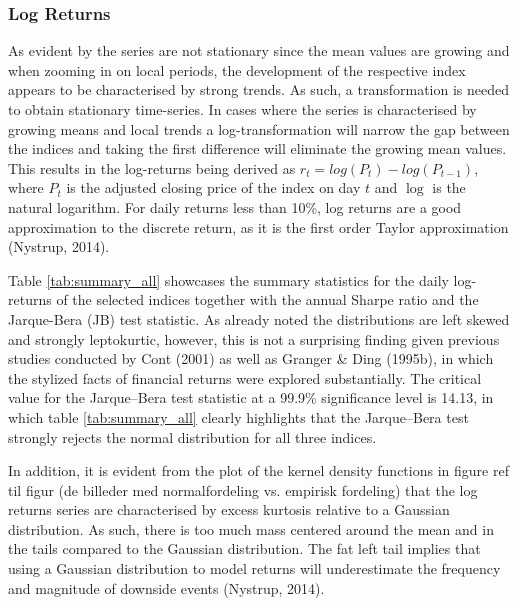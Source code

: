 \subsubsection{Log Returns}
As evident by the series are not stationary since the mean values are growing and when zooming in on local periods, the development of the respective index appears to be characterised by strong trends. As such, a transformation is needed to obtain stationary time-series. In cases where the series is characterised by growing means and local trends a log-transformation will narrow the gap between the indices and taking the first difference will eliminate the growing mean values. This results in the log-returns being derived as $r_t = log(P_t) - log(P_{t-1})$, where $P_t$ is the adjusted closing price of the index on day $t$ and $\log$ is the natural logarithm. For daily returns less than 10\%, log returns are a good approximation to the discrete return, as it is the first order Taylor approximation (Nystrup, 2014).

Table \ref{tab:summary_all} showcases the summary statistics for the daily log-returns of the selected indices together with the annual Sharpe ratio and the Jarque-Bera (JB) test statistic. As already noted the distributions are left skewed and strongly leptokurtic, however, this is not a surprising finding given previous studies conducted by Cont (2001) as well as Granger \& Ding (1995b), in which the stylized facts of financial returns were explored substantially. The critical value for the Jarque–Bera test statistic at a 99.9\% significance level is 14.13, in which table \ref{tab:summary_all} clearly highlights that the Jarque–Bera test strongly rejects the normal distribution for all three indices.  

In addition, it is evident from the plot of the kernel density functions in figure ref til figur (de billeder med normalfordeling vs. empirisk fordeling) that the log returns series are characterised by excess kurtosis relative to a Gaussian distribution. As such, there is too much mass centered around the mean and in the tails compared to the Gaussian distribution. The fat left tail implies that using a Gaussian distribution to model returns will underestimate the frequency and magnitude of downside events (Nystrup, 2014). 

